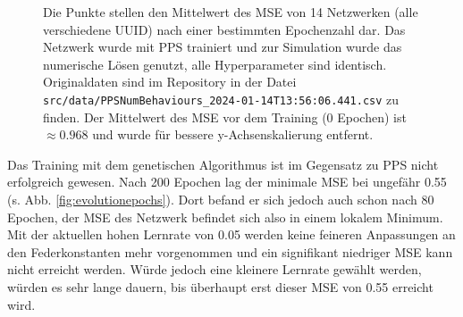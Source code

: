 \documentclass[10pt]{scrartcl}
\newcommand{\filepath}[1]{\texttt{#1}}
\begin{document}
\begin{figure}[H]
    \centering
    \Data
    \caption{Die Punkte stellen den Mittelwert des MSE von 14 Netzwerken (alle verschiedene UUID) nach einer bestimmten Epochenzahl dar. Das Netzwerk wurde mit PPS trainiert und zur Simulation wurde das numerische Lösen genutzt, alle Hyperparameter sind identisch. Originaldaten sind im Repository \cite{RepoMNN} in der Datei \filepath{src/data/PPSNumBehaviours\_2024-01-14T13:56:06.441.csv} zu finden. Der Mittelwert des MSE vor dem Training (0 Epochen) ist $\approx \num{0.968}$ und wurde für bessere y-Achsenskalierung entfernt.}
    \label{fig:ppsepochs}
\end{figure}

Das Training mit dem genetischen Algorithmus ist im Gegensatz zu PPS nicht erfolgreich gewesen.
Nach 200 Epochen lag der minimale MSE bei ungefähr \num{0.55} (s. Abb. \ref{fig:evolutionepochs}).
Dort befand er sich jedoch auch schon nach 80 Epochen, der MSE des Netzwerk befindet sich also in einem lokalem Minimum.
Mit der aktuellen hohen Lernrate von \num{0.05} werden keine feineren Anpassungen an den Federkonstanten mehr vorgenommen und ein signifikant niedriger MSE kann nicht erreicht werden.
Würde jedoch eine kleinere Lernrate gewählt werden, würden es sehr lange dauern, bis überhaupt erst dieser MSE von \num{0.55} erreicht wird.
\end{document}

